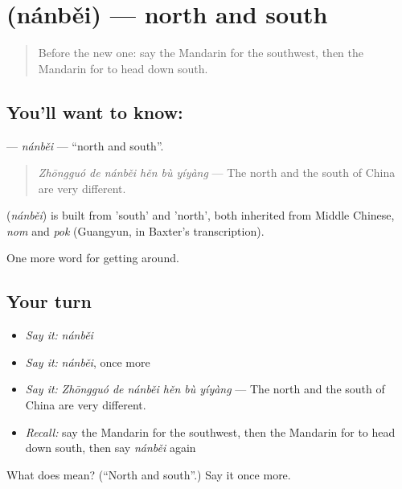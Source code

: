 \section[\texorpdfstring{\zh{南北} (nánběi)}{南北 (nánběi)}]{ (nánběi) — north and south}

\label{lesson:ZH-C423-nanbei}



\begin{quote}
Before the new one: say the Mandarin for the southwest, then the Mandarin for to head down south.
\end{quote}

\subsection*{You'll want to know: }
\textbf{} — \emph{nánběi} — \textquotedblleft{}north and south\textquotedblright{}.

\begin{quote}
\emph{Zhōngguó de nánběi hěn bù yíyàng} — The north and the south of China are very different.
\end{quote}

\begin{cousinweb}
\textbf{} (\emph{nánběi}) is built from  'south' and  'north', both inherited from Middle Chinese, \emph{nom} and \emph{pok} (Guangyun, in Baxter's transcription).
\end{cousinweb}

\begin{grammarlens}[title={What you've built}]
One more word for getting around.
\end{grammarlens}

\subsection*{Your turn}
\begin{itemize}
\raggedright
  \item \emph{Say it:} \emph{nánběi}
  \item \emph{Say it:} \emph{nánběi}, once more
  \item \emph{Say it:} \emph{Zhōngguó de nánběi hěn bù yíyàng} — The north and the south of China are very different.
  \item \emph{Recall:} say the Mandarin for the southwest, then the Mandarin for to head down south, then say \emph{nánběi} again
\end{itemize}

\begin{tcolorbox}[breakable,colback=teal!4,colframe=teal!35!black,title={Before you move on}]
What does  mean? (\textquotedblleft{}North and south\textquotedblright{}.) Say it once more.
\end{tcolorbox}
